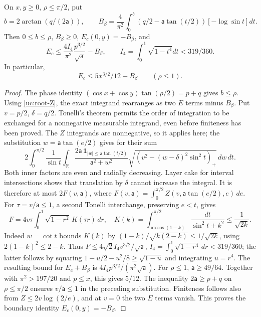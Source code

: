 \begin{lemma}\label{uc:central-pair}
On $x,y\geq0$, $\rho\leq\pi/2$, put
\[
 b=2\arctan(q/(2\mathsf a)),\qquad
 B_\beta=\frac4{\pi^2}\int_0^b
       (q/2-\mathsf a\tan(t/2))[-\log\sin t]dt.
\]
Then $0\leq b\leq\rho$, $B_\beta\geq0$, $E_c(0,y)=-B_\beta$, and
\begin{equation}\label{uc:central-pair-general}
 E_c\leq\frac{4I_4}{\pi^2}\frac{p^{3/2}}{\sqrt{\mathsf a}}-B_\beta,
 \qquad I_4=\int_0^1\sqrt{1-t^4}dt<319/360.
\end{equation}
In particular,
\begin{equation}\label{uc:central-pair-bounds}
 E_c\leq5x^{3/2}/12-B_\beta\qquad(\rho\leq1).
\end{equation}
\end{lemma}
\begin{proof}
The phase identity $(\cos x+\cos y)\tan(\rho/2)=p+q$ gives
$b\leq\rho$. Using \eqref{uc:root-Z}, the exact integrand rearranges
as two $E$ terms minus $B_\beta$. Put $v=p/2$, $\delta=q/2$.
Tonelli's theorem permits the order of integration to be exchanged
for a nonnegative measurable integrand, even before finiteness has
been proved. The $Z$ integrands are nonnegative, so it applies here;
the substitution $w=\mathsf{a}\tan(e/2)$ gives for their sum
\[
 2\int_0^{\pi/2}\frac1{\sin t}\int_{\mathbb R}
 \frac{2\mathsf{a}\,\mathbf1_{|w|\leq\mathsf a\tan(t/2)}}{\mathsf{a}^2+w^2}
        \sqrt{(v^2-(w-\delta)^2\sin^2t)_+}\,dw\,dt.
\]
Both inner factors are even and radially decreasing. Layer cake for
interval intersections shows that translation by $\delta$ cannot
increase the integral. It is therefore at most
$2F(v,\mathsf{a})$, where $F(v,\mathsf{a})=\int_0^{\pi/2}Z(v,\mathsf{a}\tan(e/2),e)\,de$.
For $\tau=v/\mathsf{a}\leq1$, a second Tonelli interchange, preserving
$e<t$, gives
\[
 F=4v\tau\int_0^1\sqrt{1-r^2}\,K(\tau r)\,dr,
 \quad K(k)=\int_{\arccos(1-k)}^{\pi/2}\frac{dt}{\sin^2t+k^2}
 \leq\frac1{\sqrt{2k}}.
\]
Indeed $w=\cot t$ bounds $K(k)$ by
$(1-k)/\sqrt{k(2-k)}\leq1/\sqrt{2k}$, using
$2(1-k)^2\leq2-k$. Thus
$F\leq4\sqrt2 I_4v^{3/2}/\sqrt {\mathsf{a}}$,
$I_4=\int_0^1\sqrt{1-r^4}\,dr<319/360$; the latter follows by
squaring $1-u/2-u^2/8\geq\sqrt{1-u}$ and integrating $u=r^4$.
The resulting bound for $E_c+B_\beta$ is
$4I_4p^{3/2}/(\pi^2\sqrt {\mathsf{a}})$.
For $\rho\leq1$, $\mathsf a\geq49/64$. Together with
$\pi^2>197/20$ and $p\leq x$, this gives $5/12$.
The inequality $2\mathsf a\geq p+q$ on $\rho\leq\pi/2$ ensures
$v/\mathsf a\leq1$ in the preceding substitution. Finiteness follows
also from $Z\leq2v\log(2/e)$, and at $v=0$ the two $E$ terms
vanish. This proves the boundary identity $E_c(0,y)=-B_\beta$.
\end{proof}

